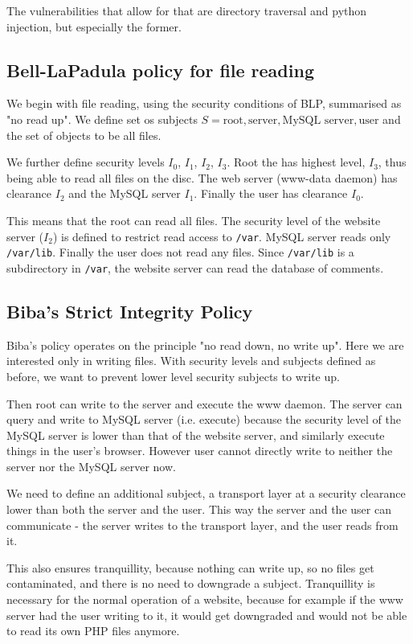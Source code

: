 \documentclass[11pt,journal]{article}
\begin{document}
	The vulnerabilities that allow for that are directory traversal and python injection, but especially the former.
	
	\subsection{Bell-LaPadula policy for file reading}
	We begin with file reading, using the security conditions of BLP, summarised as "no read up". We define set os subjects $S = {\text{root}, \text{server}, \text{MySQL server}, \text{user}}$ and the set of objects to be all files.
	
	We further define security levels $I_0$, $I_1$, $I_2$, $I_3$. Root the has highest level, $I_3$, thus being able to read all files on the disc. The web server (www-data daemon) has clearance $I_2$ and the MySQL server $I_1$. Finally the user has clearance $I_0$. 
	
	This means that the root can read all files. The security level of the website server ($I_2$) is defined to restrict read access to \texttt{/var}. MySQL server reads only \texttt{/var/lib}. Finally the user does not read any files. Since \texttt{/var/lib} is a subdirectory in \texttt{/var}, the website server can read the database of comments.
	
	\subsection{Biba's Strict Integrity Policy}
	
	Biba's policy operates on the principle "no read down, no write up". Here we are interested only in writing files. With security levels and subjects defined as before, we want to prevent lower level security subjects to write up.
	
	Then root can write to the server and execute the www daemon. The server can query and write to MySQL server (i.e. execute) because the security level of the MySQL server is lower than that of the website server, and similarly execute things in the user's browser. However user cannot directly write to neither the server nor the MySQL server now.
	
	We need to define an additional subject, a transport layer at a security clearance lower than both the server and the user. This way the server and the user can communicate - the server writes to the transport layer, and the user reads from it.
	
	This also ensures tranquillity, because nothing can write up, so no files get contaminated, and there is no need to downgrade a subject. Tranquillity is necessary for the normal operation of a website, because for example if the www server had the user writing to it, it would get downgraded and would not be able to read its own PHP files anymore.
	
\end{document}
